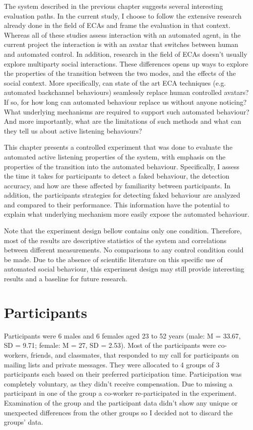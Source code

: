 \documentclass[]{simple-thesis}
\begin{document}
The system described in the previous chapter suggests several interesting evaluation paths.
In the current study, I choose to follow the extensive research already done in the field of ECAs \citep{Nishimura2007, Bevacqua2008, Gratch2007, Huang2011, Lee2006, Poppe2013} and frame the evaluation in that context.
Whereas all of these studies assess interaction with an automated agent, in the current project the interaction is with an avatar that switches between human and automated control.
In addition, research in the field of ECAs doesn't usually explore multiparty social interactions.
These differences opens up ways to explore the properties of the transition between the two modes, and the effects of the social context.
More specifically, can state of the art ECA techniques (e.g. automated backchannel behaviours) seamlessly replace human controlled avatars?
If so, for how long can automated behaviour replace us without anyone noticing?
What underlying mechanisms are required to support such automated behaviour?
And more importantly, what are the limitations of such methods and what can they tell us about active listening behaviours?

This chapter presents a controlled experiment that was done to evaluate the automated active listening properties of the system, with emphasis on the properties of the transition into the automated behaviour.
Specifically, I assess the time it takes for participants to detect a faked behaviour, the detection accuracy, and how are these affected by familiarity between participants.
In addition, the participants strategies for detecting faked behaviour are analyzed and compared to their performance.
This information have the potential to explain what underlying mechanism more easily expose the automated behaviour.

Note that the experiment design bellow contains only one condition.
Therefore, most of the results are descriptive statistics of the system and correlations between different measurements.
No comparisons to any control condition could be made.
Due to the absence of scientific literature on this specific use of automated social behaviour, this experiment design may still provide interesting results and a baseline for future research.

\section{Participants}

Participants were 6 males and 6 females aged 23 to 52 years (male: M = 33.67, SD = 9.71; female: M = 27, SD = 2.53).
Most of the participants were co-workers, friends, and classmates, that responded to my call for participants on mailing lists and private messages.
They were allocated to 4 groups of 3 participants each based on their preferred participation time.
Participation was completely voluntary, as they didn't receive compensation.
Due to missing a participant in one of the group a co-worker re-participated in the experiment.
Examination of the group and the participant data didn't show any unique or unexpected differences from the other groups so I decided not to discard the groups' data.
\end{document}

